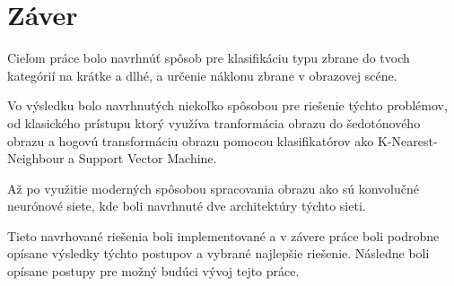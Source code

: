 
\chapter{Záver}

Cieľom práce bolo navrhnúť spôsob pre klasifikáciu typu zbrane do tvoch kategórií na krátke a dlhé, a
    určenie náklonu zbrane v obrazovej scéne.

Vo výsledku bolo navrhnutých niekoľko spôsobou pre riešenie týchto problémov, od klasického prístupu
    ktorý využíva tranformácia obrazu do šedotónového obrazu a hogovú transformáciu obrazu pomocou
    klasifikatórov ako K-Nearest-Neighbour a Support Vector Machine.

Až po využitie moderných spôsobou spracovania obrazu ako sú konvolučné neurónové siete, kde boli navrhnuté
    dve architektúry týchto sieti.

Tieto navrhované riešenia boli implementované a v závere práce boli podrobne opísane výsledky týchto postupov a
    vybrané najlepšie riešenie.
Následne boli opísane postupy pre možný budúci vývoj tejto práce.
